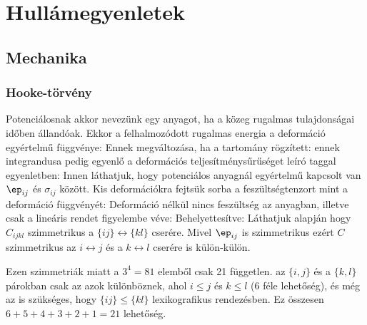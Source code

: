 \chapter{Hullámegyenletek}
 
 \section{Mechanika}
  
  \subsection{Hooke-törvény}
   
   Potenciálosnak akkor nevezünk egy anyagot, ha a közeg rugalmas tulajdonságai időben állandóak.
   Ekkor a felhalmozódott rugalmas energia a deformáció egyértelmű függvénye:
   Ennek megváltozása, ha a tartomány rögzített:
   ennek integrandusa pedig egyenlő a deformációs teljesítménysűrűséget leíró taggal  egyenletben:
%    
   Innen láthatjuk, hogy potenciálos anyagnál egyértelmű kapcsolt van $\ep_{ij}$ és $\sigma_{ij}$ között.
   Kis deformációkra fejtsük sorba a feszültségtenzort mint a deformáció függvényét:
   Deformáció nélkül nincs feszültség az anyagban, illetve csak a lineáris rendet figyelembe véve:
   Behelyettesítve:
%    
   Láthatjuk  alapján hogy $C_{ijkl}$ szimmetrikus a $\{ij\}\leftrightarrow\{kl\}$ cserére.
   Mivel $\ep_{ij}$ is szimmetrikus ezért $C$ szimmetrikus az $i\leftrightarrow j$ és a $k\leftrightarrow l$ cserére is külön-külön.
   
   Ezen szimmetriák miatt a $3^4=81$ elemből csak 21 független. az $\{i,j\}$ és a $\{k,l\}$ párokban csak az azok különböznek, ahol $i\leq j$ és $k\leq l$ (6 féle lehetőség), és még az is szükséges, hogy $\{ij\} \leq \{kl\}$ lexikografikus rendezésben.
   Ez összesen $6+5+4+3+2+1=21$ lehetőség. 
   
